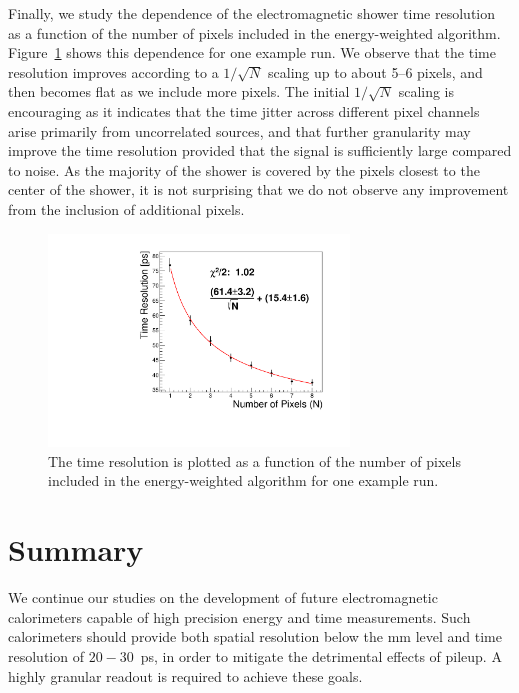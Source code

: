 Finally, we study the dependence of the electromagnetic shower time resolution
as a function of the number of pixels included in the energy-weighted algorithm.
Figure~\ref{fig:sqrtN} shows this dependence for one example run. We observe
that the time resolution improves according to a $1/\sqrt{N}$ scaling up to
about 5--6 pixels, and then becomes flat as we include more pixels. The
initial $1/\sqrt{N}$ scaling is encouraging as it indicates that the time jitter across
different pixel channels arise primarily from uncorrelated sources, and that
further granularity may improve the time resolution provided that the signal is
sufficiently large compared to noise. As the majority of the shower is
covered by the pixels closest to the center of the shower, it is not surprising
that we do not observe any improvement from the inclusion of additional pixels.

\begin{figure}[htbp]
  \centering
  \includegraphics[width=8cm]{Images/sqrtN/t1065_run_38_Dt_IWP.pdf}
  \caption{ The time resolution is plotted as a function of the number of pixels
    included in the energy-weighted algorithm for one example run. }
  \label{fig:sqrtN}
\end{figure}

\section{Summary} 

We continue our studies on the development of future electromagnetic 
calorimeters capable of high precision energy and time measurements.
Such calorimeters should provide both spatial resolution below the $\mathrm{mm}$
level and time resolution of $20-30$~ps, in order to mitigate the detrimental effects
of pileup. A highly granular readout is required to achieve these goals. 

